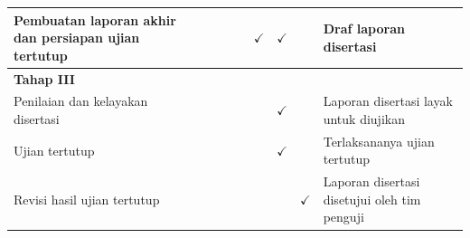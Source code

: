 \begin{table}[H]
{\begin{tabular}{>{\raggedright\arraybackslash}p{4.4cm} *{8}{c} >{\raggedright\arraybackslash}p{6.1cm}}
\midrule
Pembuatan laporan akhir dan persiapan ujian tertutup & & & & & & $\checkmark$ & $\checkmark$ & & Draf laporan disertasi \\
\midrule
\textbf{Tahap III} & & & & & & & & & \\
\midrule
Penilaian dan kelayakan disertasi & & & & & & & $\checkmark$ & & Laporan disertasi layak untuk diujikan \\
\midrule
Ujian tertutup & & & & & & & $\checkmark$ & & Terlaksananya ujian tertutup \\
\midrule
Revisi hasil ujian tertutup & & & & & & & & $\checkmark$ & Laporan disertasi disetujui oleh tim penguji \\
\bottomrule
\end{tabular}%
}
\normalsize
\end{table}